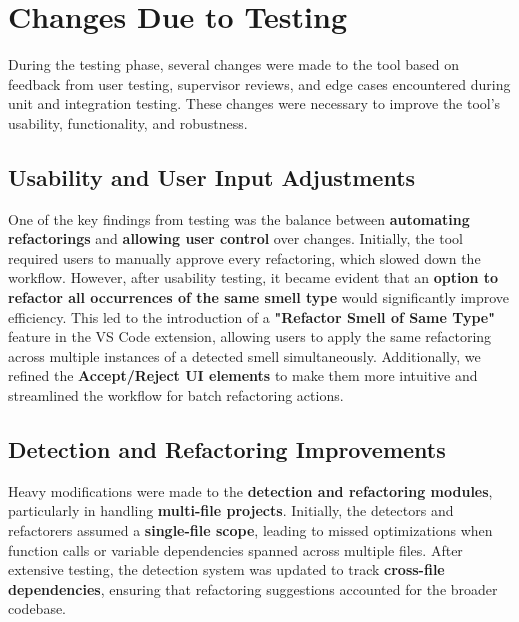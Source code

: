\documentclass[12pt, titlepage]{article}
\begin{document}
\section{Changes Due to Testing}


During the testing phase, several changes were made to the tool based
on feedback from user testing, supervisor reviews, and edge cases
encountered during unit and integration testing. These changes were
necessary to improve the tool's usability, functionality, and robustness.

\subsection{Usability and User Input Adjustments}
One of the key findings from testing was the balance between
\textbf{automating refactorings} and \textbf{allowing user control}
over changes. Initially, the tool required users to manually approve
every refactoring, which slowed down the workflow. However, after
usability testing, it became evident that an \textbf{option to
refactor all occurrences of the same smell type} would significantly
improve efficiency. This led to the introduction of a
\textbf{"Refactor Smell of Same Type"} feature in the VS Code
extension, allowing users to apply the same refactoring across
multiple instances of a detected smell simultaneously. Additionally,
we refined the \textbf{Accept/Reject UI elements} to make them more
intuitive and streamlined the workflow for batch refactoring actions.

\subsection{Detection and Refactoring Improvements}
Heavy modifications were made to the \textbf{detection and
refactoring modules}, particularly in handling \textbf{multi-file
projects}. Initially, the detectors and refactorers assumed a
\textbf{single-file scope}, leading to missed optimizations when
function calls or variable dependencies spanned across multiple
files. After extensive testing, the detection system was updated to
track \textbf{cross-file dependencies}, ensuring that refactoring
suggestions accounted for the broader codebase.
\end{document}
